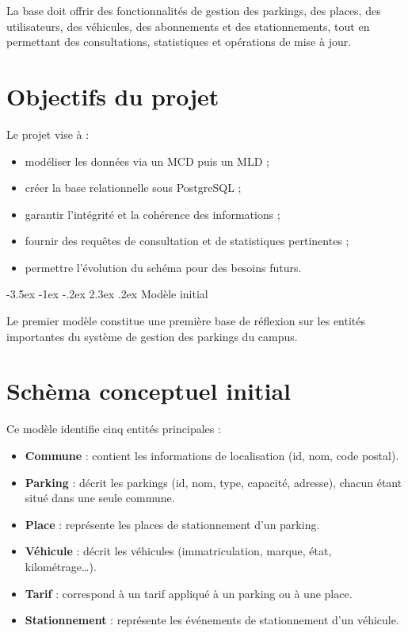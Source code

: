 \documentclass[a4paper,12pt]{report}
\makeatletter
\def\chapter{\@startsection {chapter}{0}{\z@}
                                   {-3.5ex \@plus -1ex \@minus -.2ex}
                                   {2.3ex \@plus.2ex}
                                   {\normalfont\huge\bfseries}}
\makeatother
\begin{document}
La base doit offrir des fonctionnalités de gestion des parkings, des places, des utilisateurs, 
des véhicules, des abonnements et des stationnements, tout en permettant des consultations, 
statistiques et opérations de mise à jour.

\section{Objectifs du projet}
Le projet vise à :
\begin{itemize}
    \item modéliser les données via un MCD puis un MLD ;
    \item créer la base relationnelle sous PostgreSQL ;
    \item garantir l'intégrité et la cohérence des informations ;
    \item fournir des requêtes de consultation et de statistiques pertinentes ;
    \item permettre l'évolution du schéma pour des besoins futurs.
\end{itemize}

\chapter{Modèle initial}

Le premier modèle constitue une première base de réflexion sur les entités importantes du système 
de gestion des parkings du campus.

\section{Schèma conceptuel initial}

Ce modèle identifie cinq entités principales :
\begin{itemize}
    \item \textbf{Commune} : contient les informations de localisation (id, nom, code postal).
    \item \textbf{Parking} : décrit les parkings (id, nom, type, capacité, adresse), chacun étant situé dans une seule commune.
    \item \textbf{Place} : représente les places de stationnement d’un parking.
    \item \textbf{Véhicule} : décrit les véhicules (immatriculation, marque, état, kilométrage…).
    \item \textbf{Tarif} : correspond à un tarif appliqué à un parking ou à une place.
    \item \textbf{Stationnement} : représente les événements de stationnement d’un véhicule.
\end{itemize}
\end{document}
